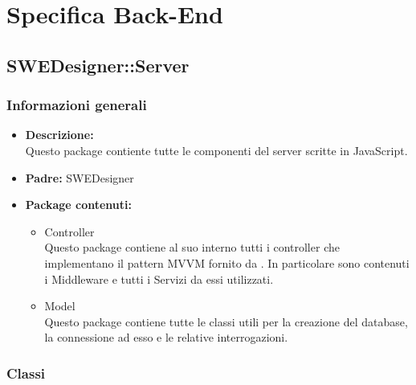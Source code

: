 \section{Specifica Back-End}
  \subsection{SWEDesigner::Server}
    \subsubsection{Informazioni generali}
      \begin{itemize}
        \item \textbf{Descrizione:}\\
        Questo package contiente tutte le componenti del server scritte in JavaScript.
        \item \textbf{Padre: } SWEDesigner
        \item \textbf{Package contenuti:}\\
        \begin{itemize}
          \item Controller \\
          Questo package contiene al suo interno tutti i controller che implementano il pattern MVVM fornito da .
          In particolare sono contenuti i Middleware e tutti i Servizi da essi utilizzati.
          \item Model \\
          Questo package contiene tutte le classi utili per la creazione del database, la connessione ad esso e le relative interrogazioni.
        \end{itemize}
      \end{itemize}
    \subsubsection{Classi}
